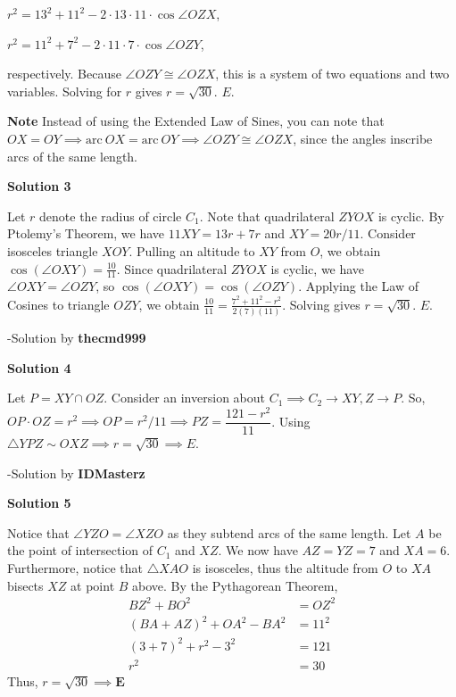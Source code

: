 \begin{enumerate}
 $r^2 = 13^2 + 11^2 - 2 \cdot 13 \cdot 11 \cdot \cos{\angle{OZX}}$,

 $r^2 = 11^2 + 7^2 - 2 \cdot 11 \cdot 7 \cdot \cos{\angle{OZY}}$, 

 respectively. Because $\angle{OZY} \cong \angle{OZX}$, this is a system of two equations and two variables. Solving for $r$ gives $r = \sqrt{30}$. $\boxed{E}$.

 \textbf{Note} Instead of using the Extended Law of Sines, you can note that $OX = OY \implies \text{arc}\ OX =\text{arc}\ OY \implies \angle{OZY} \cong \angle{OZX}$, since the angles inscribe arcs of the same length.

 



\textbf{Solution 3}

Let $r$ denote the radius of circle $C_1$. Note that quadrilateral $ZYOX$ is cyclic. By Ptolemy's Theorem, we have $11XY=13r+7r$ and $XY=20r/11$. Consider isosceles triangle $XOY$. Pulling an altitude to $XY$ from $O$, we obtain $\cos(\angle{OXY}) = \frac{10}{11}$. Since quadrilateral $ZYOX$ is cyclic, we have $\angle{OXY}=\angle{OZY}$, so $\cos(\angle{OXY}) = \cos(\angle{OZY})$. Applying the Law of Cosines to triangle $OZY$, we obtain $\frac{10}{11} = \frac{7^2+11^2-r^2}{2(7)(11)}$. Solving gives $r=\sqrt{30}$. $\boxed{E}$.

 -Solution by \textbf{thecmd999}

 



\textbf{Solution 4}

Let $P = XY \cap OZ$. Consider an inversion about $C_1 \implies C_2 \to XY, Z \to P$. So,  $OP \cdot OZ = r^2 \implies OP = r^2/11 \implies PZ = \dfrac{121 - r^2}{11}$. Using $\triangle YPZ \sim OXZ \implies  r = \sqrt{30} \implies \boxed{E}$.

 
-Solution by \textbf{IDMasterz}

 



\textbf{Solution 5}

Notice that $\angle YZO=\angle XZO$ as they subtend arcs of the same length. Let $A$ be the point of intersection of $C_1$ and $XZ$. We now have $AZ=YZ=7$ and $XA=6$. Furthermore, notice that $\triangle XAO$ is isosceles, thus the altitude from $O$ to $XA$ bisects $XZ$ at point $B$ above. By the Pythagorean Theorem, 
 \begin{align*}BZ^2+BO^2&=OZ^2\\(BA+AZ)^2+OA^2-BA^2&=11^2\\(3+7)^2+r^2-3^2&=121\\r^2&=30\end{align*}
Thus, $r=\sqrt{30}\implies\boxed{\textbf{E}}$





\end{enumerate}
